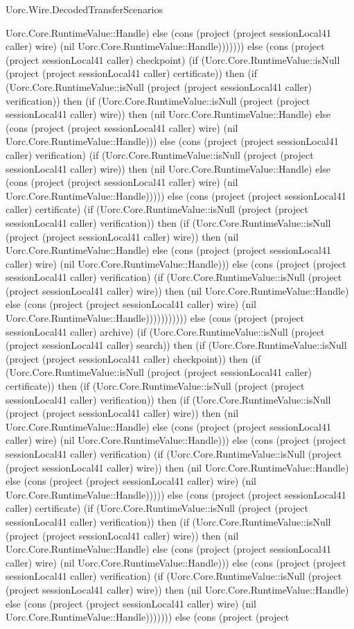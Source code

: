 \begin{lexlean}{Uorc.Wire.DecodedTransferScenarios}
\begin{semanticmodule}
{Uorc.Core.RuntimeValue::Handle) else (cons (project (project sessionLocal41 caller) wire) (nil Uorc.Core.RuntimeValue::Handle))))))) else (cons (project (project sessionLocal41 caller) checkpoint) (if (Uorc.Core.RuntimeValue::isNull (project (project sessionLocal41 caller) certificate)) then (if (Uorc.Core.RuntimeValue::isNull (project (project sessionLocal41 caller) verification)) then (if (Uorc.Core.RuntimeValue::isNull (project (project sessionLocal41 caller) wire)) then (nil Uorc.Core.RuntimeValue::Handle) else (cons (project (project sessionLocal41 caller) wire) (nil Uorc.Core.RuntimeValue::Handle))) else (cons (project (project sessionLocal41 caller) verification) (if (Uorc.Core.RuntimeValue::isNull (project (project sessionLocal41 caller) wire)) then (nil Uorc.Core.RuntimeValue::Handle) else (cons (project (project sessionLocal41 caller) wire) (nil Uorc.Core.RuntimeValue::Handle))))) else (cons (project (project sessionLocal41 caller) certificate) (if (Uorc.Core.RuntimeValue::isNull (project (project sessionLocal41 caller) verification)) then (if (Uorc.Core.RuntimeValue::isNull (project (project sessionLocal41 caller) wire)) then (nil Uorc.Core.RuntimeValue::Handle) else (cons (project (project sessionLocal41 caller) wire) (nil Uorc.Core.RuntimeValue::Handle))) else (cons (project (project sessionLocal41 caller) verification) (if (Uorc.Core.RuntimeValue::isNull (project (project sessionLocal41 caller) wire)) then (nil Uorc.Core.RuntimeValue::Handle) else (cons (project (project sessionLocal41 caller) wire) (nil Uorc.Core.RuntimeValue::Handle))))))))))) else (cons (project (project sessionLocal41 caller) archive) (if (Uorc.Core.RuntimeValue::isNull (project (project sessionLocal41 caller) search)) then (if (Uorc.Core.RuntimeValue::isNull (project (project sessionLocal41 caller) checkpoint)) then (if (Uorc.Core.RuntimeValue::isNull (project (project sessionLocal41 caller) certificate)) then (if (Uorc.Core.RuntimeValue::isNull (project (project sessionLocal41 caller) verification)) then (if (Uorc.Core.RuntimeValue::isNull (project (project sessionLocal41 caller) wire)) then (nil Uorc.Core.RuntimeValue::Handle) else (cons (project (project sessionLocal41 caller) wire) (nil Uorc.Core.RuntimeValue::Handle))) else (cons (project (project sessionLocal41 caller) verification) (if (Uorc.Core.RuntimeValue::isNull (project (project sessionLocal41 caller) wire)) then (nil Uorc.Core.RuntimeValue::Handle) else (cons (project (project sessionLocal41 caller) wire) (nil Uorc.Core.RuntimeValue::Handle))))) else (cons (project (project sessionLocal41 caller) certificate) (if (Uorc.Core.RuntimeValue::isNull (project (project sessionLocal41 caller) verification)) then (if (Uorc.Core.RuntimeValue::isNull (project (project sessionLocal41 caller) wire)) then (nil Uorc.Core.RuntimeValue::Handle) else (cons (project (project sessionLocal41 caller) wire) (nil Uorc.Core.RuntimeValue::Handle))) else (cons (project (project sessionLocal41 caller) verification) (if (Uorc.Core.RuntimeValue::isNull (project (project sessionLocal41 caller) wire)) then (nil Uorc.Core.RuntimeValue::Handle) else (cons (project (project sessionLocal41 caller) wire) (nil Uorc.Core.RuntimeValue::Handle))))))) else (cons (project (project }
\end{semanticmodule}
\end{lexlean}
